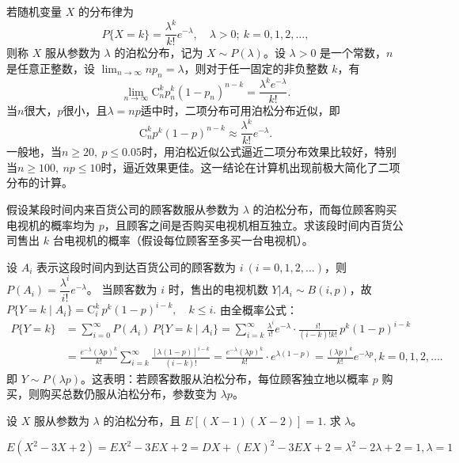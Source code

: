 \documentclass[lang=cn,11pt]{elegantbook}
\begin{document}
\begin{definition}[泊松分布] \label{def:poisson-dist}
若随机变量 $X$ 的分布律为
\[
P\{X = k\} = \frac{\lambda^k}{k!} e^{-\lambda},\quad \lambda > 0;\ k=0,1,2,\dots,
\]
则称 $X$ 服从参数为 $\lambda$ 的泊松分布，记为 $X \sim P(\lambda)$。设 $\lambda > 0$ 是一个常数，$n$ 是任意正整数，设 $\lim_{n \to \infty} np_n = \lambda$，则对于任一固定的非负整数 $k$，有
\[
\lim_{n \to \infty} \mathrm{C}_n^k p_n^k (1-p_n)^{n-k} = \frac{\lambda^k e^{-\lambda}}{k!}.
\]当$n$很大，$p$很小，且$\lambda = np$适中时，二项分布可用泊松分布近似，即
\[
\mathrm{C}_n^k p^k (1-p)^{n-k} \approx \frac{\lambda^k}{k!} e^{-\lambda}.
\]
一般地，当$n \ge 20,\ p \le 0.05$时，用泊松近似公式逼近二项分布效果比较好，特别当$n \ge 100,\ np \le 10$时，逼近效果更佳。这一结论在计算机出现前极大简化了二项分布的计算。
\end{definition}

\begin{exercise}[泊松分布]\label{exer:2-27}
假设某段时间内来百货公司的顾客数服从参数为 $\lambda$ 的泊松分布，而每位顾客购买电视机的概率均为 $p$，且顾客之间是否购买电视机相互独立。求该段时间内百货公司售出 $k$ 台电视机的概率（假设每位顾客至多买一台电视机）。
\end{exercise}

\begin{solution}
设 $A_i$ 表示这段时间内到达百货公司的顾客数为 $i\ (i=0,1,2,\dots)$，则 $P(A_i) = \dfrac{\lambda^i}{i!}e^{-\lambda}$。
当顾客数为 $i$ 时，售出的电视机数 $Y|A_i \sim B(i,p)$，故
\(
P\{Y=k \mid A_i\} = \mathrm{C}_i^k\, p^k(1-p)^{i-k}, \quad k \le i.
\)
由全概率公式：
\begin{align*}
P\{Y=k\} &= \sum_{i=0}^{\infty} P(A_i)\,P\{Y=k \mid A_i\} = \sum_{i=k}^{\infty} \frac{\lambda^i}{i!}e^{-\lambda} \cdot \frac{i!}{(i-k)!k!}\, p^k(1-p)^{i-k} \\
&= \frac{e^{-\lambda}(\lambda p)^k}{k!} \sum_{i=k}^{\infty} \frac{[\lambda(1-p)]^{i-k}}{(i-k)!}= \frac{e^{-\lambda}(\lambda p)^k}{k!} \cdot e^{\lambda(1-p)}=\frac{(\lambda p)^k}{k!} e^{-\lambda p},  k=0,1,2,\dots.
\end{align*}
即 $Y \sim P(\lambda p)$。这表明：若顾客数服从泊松分布，每位顾客独立地以概率 $p$ 购买，则购买总数仍服从泊松分布，参数变为 $\lambda p$。
\end{solution}

\begin{exercise}\label{exer:src-2013-a-01-01}
设 \(X\) 服从参数为 \(\lambda\) 的泊松分布，且
\(
E[(X-1)(X-2)]=1.
\)
求 \(\lambda\)。
\end{exercise}
\begin{solution}
\[
E(X^2-3X+2)=EX^2-3EX+2=DX+(EX)^2-3EX+2
=\lambda^2-2\lambda+2=1,\lambda=1
\]
\end{solution}
\end{document}
